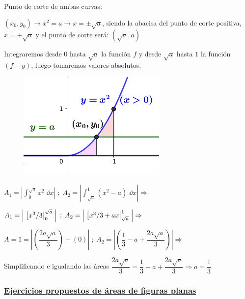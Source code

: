 \begin{proofw}\renewcommand{\qedsymbol}{$\diamond$}


\begin{multicols}{2}

Punto de corte de ambas curvas:

$(x_0,y_0) \to x^2= a \to x=\pm\sqrt{a}$,
siendo la abacisa del punto de corte positiva, 
$x=+\sqrt{a}  $ y el punto de corte será:
$(\sqrt{a}, a)$

Integraremos desde $0$ hasta $\sqrt a$  la función $f$ y desde $\sqrt a$ hasta $1$ la función $(f-g)$, luego tomaremos valores absolutos.
	\begin{figure}[H]
	\centering
	\includegraphics[width=.45\textwidth]{imagenes/imagenes08/T08IM20.png}
	\end{figure}
\end{multicols}

$A_1=\displaystyle \left| \int_{0}^{\sqrt{a}} x^2 \; \dd x \right| \; ; \; A_2 = \left| \int_{\sqrt{a}}^{1} (x^2-a) \; \dd x \right| \Rightarrow $

$ A_1=\left| \; \eval[x^3/3|_{0}^{\sqrt{a}} \; \right|\; ; \; A_2=\left| \; \eval[x^3/3+ax|_{\sqrt{a}}^{1} \; \right| \Rightarrow$

$ A=1=\left| \left(\dfrac{2a\sqrt{a}}{3} \right)-(0) \right| \; ; \; A_2= \left| \left(\dfrac 1 3 - a+ \dfrac {2a\sqrt{a}}{3} \right) \right|\Rightarrow$

Simplificando e igualando las áreas $\dfrac {2a\sqrt{a}}{3}= \dfrac 1 3 -a + \dfrac {2a\sqrt{a}}{3} \Rightarrow a=\dfrac 1 3 $

\end{proofw}


\subsubsection{\underline{Ejercicios propuestos de áreas de figuras planas}}

